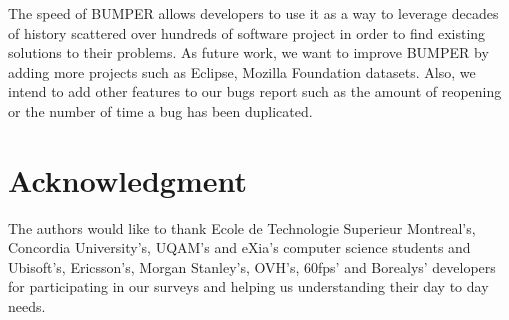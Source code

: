 \documentclass[conference]{IEEEtran}
\begin{document}
The speed of BUMPER allows developers to use it as a way to leverage decades of history scattered over hundreds of software project in order to find existing solutions to their problems. As future work, we want to improve BUMPER by adding more projects such as Eclipse, Mozilla Foundation datasets.
Also, we intend to add other features to our bugs report such as the amount of reopening or the number of time a bug has been duplicated.


\section*{Acknowledgment}


The authors would like to thank Ecole de Technologie Superieur Montreal's, Concordia University's, UQAM's and eXia's computer science students and Ubisoft's, Ericsson's, Morgan Stanley's, OVH's, 60fps' and Borealys' developers for participating in our surveys and helping us understanding their day to day needs.




\end{document}
